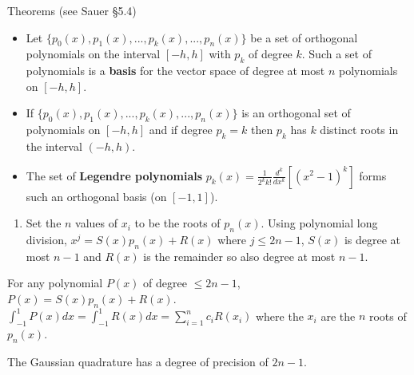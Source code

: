 \documentclass[12pt,letterpaper,noanswers]{exam}
\begin{document}
\begin{tcolorbox}
Theorems (see Sauer \S 5.4)

\begin{itemize}
\itemsep0pt
    \item Let $\{p_0(x),p_1(x),...,p_k(x),...,p_n(x)\}$ be a set of orthogonal polynomials on the interval $[-h,h]$ with $p_k$ of degree $k$.  Such a set of polynomials is a \textbf{basis} for the vector space of degree at most $n$ polynomials on $[-h,h]$.
    \item If $\{p_0(x),p_1(x),...,p_k(x),...,p_n(x)\}$ is an orthogonal set of polynomials on $[-h,h]$ and if degree $p_k = k$ then $p_k$ has $k$ distinct roots in the interval $(-h,h)$.
    \item The set of \textbf{Legendre polynomials} $\displaystyle p_k(x) = \frac{1}{2^kk!}\frac{d^k}{dx^k}\left[(x^2-1)^k\right]$ forms such an orthogonal basis (on $[-1,1]$).
\end{itemize}
\end{tcolorbox}
\begin{enumerate}[resume=classQ]
    \item Set the $n$ values of $x_i$ to be the roots of $p_n(x)$.  Using polynomial long division, $x^j = S(x)p_n(x) + R(x)$ where $j \leq 2n-1$, $S(x)$ is degree at most $n-1$ and $R(x)$ is the remainder so also degree at most $n-1$.
\end{enumerate}
\begin{tcolorbox}
For any polynomial $P(x)$ of degree $\leq 2n-1$, $P(x) = S(x)p_n(x) + R(x)$.  $\displaystyle\int_{-1}^1 P(x)dx = \int_{-1}^1 R(x)dx = \sum\limits_{i=1}^n c_i R(x_i)$ where the $x_i$ are the $n$ roots of $p_n(x)$.

The Gaussian quadrature has a degree of precision of $2n-1$.
\end{tcolorbox}
\end{document}
